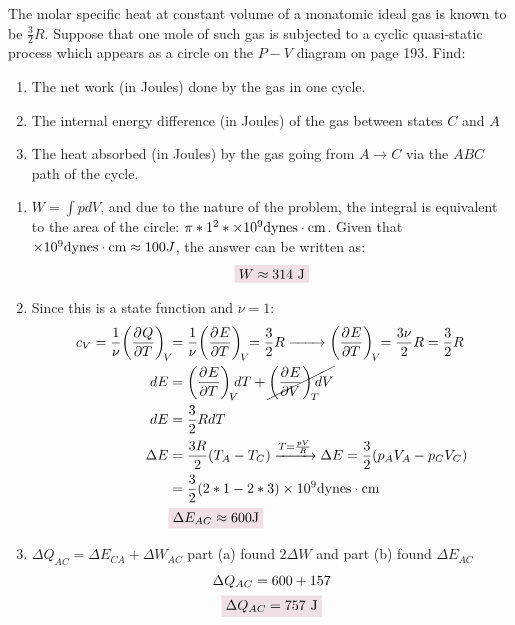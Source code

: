 \documentclass{article}
\begin{document}
\begin{problem}[Reif 5.2]
    The molar specific heat at constant volume of a monatomic ideal gas is known to be $\frac{3}{2}R$. Suppose that one mole of such gas is subjected to a cyclic quasi-static process which appears as a circle on the $P-V$ diagram on page 193. Find: 
    \begin{enumerate}[label=(\alph*)]
        \item The net work (in Joules) done by the gas in one cycle.
        \item The internal energy difference (in Joules) of the gas between states $C$ and $A$
        \item The heat absorbed (in Joules) by the gas going from $A\rightarrow C$ via the $ABC$ path of the cycle.
    \end{enumerate}
    \answerline
    \begin{enumerate}[label=\alph*)]
        \item $W=\int pdV$, and due to the nature of the problem, the integral is equivalent to the area of the circle: $\pi*1^2*\ten{9}\text{dynes}\cdot\text{cm}$. Given that $\ten{9}\text{dynes}\cdot\text{cm}\approx100J$, the answer can be written as: $$\coloredanswer{W\approx314\ \text{J}}$$
        \item Since this is a state function and $\nu=1$:
        \begin{align*}
            c_V=\oo{\nu}\pder{Q}{T}[V]&=\oo{\nu}\pder{E}{T}[V]=\frac{3}{2}R
            \xrightarrow{~~~~~~}
            \pder{E}{T}[V]=\frac{3\nu}{2}R=\frac{3}{2}R
            \\
            dE&=\pder{E}{T}[V]dT+\cancel{\pder{E}{V}[T]dV}
            \\
            dE &= \frac{3}{2}R dT 
            \\
            \Delta E &=\frac{3 R}{2}(T_A-T_C)
            \xrightarrow{T=\frac{pV}{R}}
            \Delta E= \frac{3}{2}\qty(p_AV_A-p_CV_C)
            \\
            &=\frac{3}{2}\qty(2*1-2*3)\ten{9}\text{dynes}\cdot\text{cm}
            \\
            &\coloredanswer{\Delta E_{AC}\approx600 \text{J}}
        \end{align*}
        \item $\Delta Q_{AC}=\Delta E_{CA}+\Delta W_{AC}$ part (a) found $2\Delta W$ and part (b) found $\Delta E_{AC}$
        \begin{gather*}
            \Delta Q_{AC}=600+157
            \\
            \coloredanswer{\Delta Q_{AC}=757\ \text{J}}
        \end{gather*}
    \end{enumerate}
\end{problem}\newpage
\end{document}
